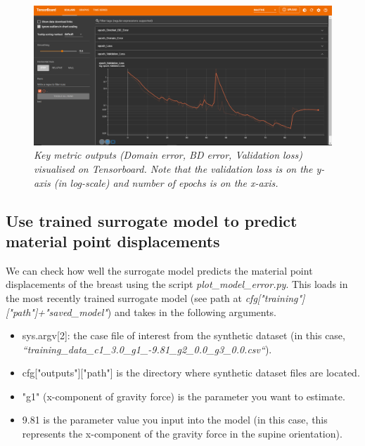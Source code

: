 \documentclass[11pt]{article}
\begin{document}
\begin{figure}
\centering
\includegraphics[scale=1.1]{Images/breast/tensorboard.png}
\caption{\textit{\label{fig7}Key metric outputs (Domain error, BD error, Validation loss) visualised on Tensorboard. Note that the validation loss is on the y-axis (in log-scale) and number of epochs is on the x-axis.}}
\end{figure}

\subsection{Use trained surrogate model to predict material point displacements}
We can check how well the surrogate model predicts the material point displacements of the breast using the script \textit{plot\_model\_error.py}. This loads in the most recently trained surrogate model (see path at \textit{cfg["training"]["path"]+"saved\_model"}) and takes in the following arguments.
\begin{itemize}
    \item sys.argv[2]: the case file of interest from the synthetic dataset (in this case, \textit{``training\_data\_c1\_3.0\_g1\_-9.81\_g2\_0.0\_g3\_0.0.csv``}).
    \item cfg["outputs"]["path"] is the directory where synthetic dataset files are located. 
    \item "g1" (x-component of gravity force) is the parameter you want to estimate. 
    \item 9.81 is the parameter value you input into the model (in this case, this represents the x-component of the gravity force in the supine orientation).
\end{itemize}
\newline
\end{document}
